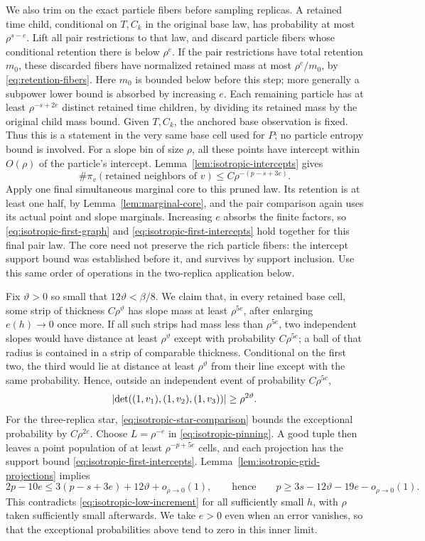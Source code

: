 We also trim on the exact particle fibers before sampling replicas. A retained
time child, conditional on $T,C_k$ in the original base law, has probability
at most $\rho^{s-e}$. Lift all pair restrictions to that law, and discard
particle fibers whose conditional retention there is below $\rho^e$.
If the pair restrictions have total retention $m_0$, these discarded fibers
have normalized retained mass at most $\rho^e/m_0$, by
\eqref{eq:retention-fibers}. Here $m_0$ is bounded below before this step;
more generally a subpower lower bound is absorbed by increasing $e$.
Each remaining particle has at least $\rho^{-s+2e}$ distinct retained time
children, by dividing its retained mass by the original child mass bound.
Given $T,C_k$, the anchored base observation is fixed. Thus this is a statement
in the very same base cell used for $P$; no particle entropy bound is involved.
For a slope bin of size $\rho$, all these points have intercept within $O(\rho)$
of the particle's intercept. Lemma~\ref{lem:isotropic-intercepts} gives
\begin{equation}
 \#\pi_v(\text{retained neighbors of }v)
 \leq C\rho^{-(p-s+3e)}.
 \label{eq:isotropic-first-intercepts}
\end{equation}
Apply one final simultaneous marginal core to this pruned law. Its retention
is at least one half, by Lemma~\ref{lem:marginal-core}, and the pair comparison
again uses its actual point and slope marginals. Increasing $e$ absorbs the
finite factors, so \eqref{eq:isotropic-first-graph} and
\eqref{eq:isotropic-first-intercepts} hold together for this final pair law.
The core need not preserve the rich particle fibers: the intercept support
bound was established before it, and survives by support inclusion. Use
this same order of operations in the two-replica application below.

Fix $\vartheta>0$ so small that $12\vartheta<\beta/8$. We claim that, in every retained
base cell, some strip of thickness $C\rho^\vartheta$ has slope mass at least
$\rho^{5e}$, after enlarging $e(h)\to0$ once more. If all such strips had
mass less than $\rho^{5e}$, two independent slopes would have distance at least
$\rho^\vartheta$ except with probability $C\rho^{5e}$; a ball of that radius is
contained in a strip of comparable thickness. Conditional on the first two,
the third would lie at distance at least $\rho^\vartheta$ from their line except
with the same probability. Hence, outside an independent event of probability
$C\rho^{5e}$,
\[
 \lvert\det((1,v_1),(1,v_2),(1,v_3))\rvert\geq\rho^{2\vartheta}.
\]
For the three-replica star, \eqref{eq:isotropic-star-comparison} bounds the
exceptional probability by $C\rho^{2e}$. Choose $L=\rho^{-e}$ in
\eqref{eq:isotropic-pinning}. A good tuple then leaves a point population of
at least $\rho^{-p+5e}$ cells, and each projection has the support bound
\eqref{eq:isotropic-first-intercepts}. Lemma~\ref{lem:isotropic-grid-projections}
implies
\[
 2p-10e\leq3(p-s+3e)+12\vartheta+o_{\rho\to0}(1),
 \qquad\text{hence}\qquad
 p\geq3s-12\vartheta-19e-o_{\rho\to0}(1).
\]
This contradicts \eqref{eq:isotropic-low-increment} for all sufficiently small
$h$, with $\rho$ taken sufficiently small afterwards. We take $e>0$ even
when an error vanishes, so that the exceptional probabilities above tend to
zero in this inner limit.

